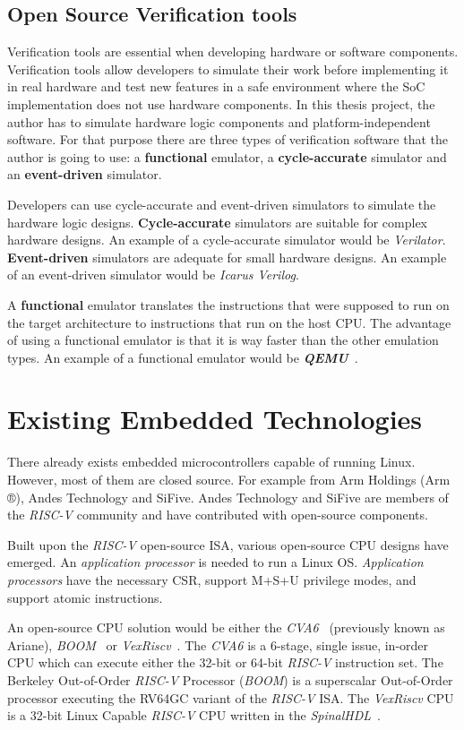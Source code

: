 \subsection{Open Source Verification tools}
Verification tools are essential when developing hardware or software components. Verification tools allow developers to simulate their work before implementing it in real hardware and test new features in a safe environment where the SoC implementation does not use hardware components. In this thesis project, the author has to simulate hardware logic components and platform-independent software. For that purpose there are three types of verification software that the author is going to use: a \textbf{functional} emulator, a \textbf{cycle-accurate} simulator and an \textbf{event-driven} simulator.

Developers can use cycle-accurate and event-driven simulators to simulate the hardware logic designs. \textbf{Cycle-accurate}  simulators are suitable for complex hardware designs. An example of a cycle-accurate simulator would be \textit{Verilator}. \textbf{Event-driven} simulators are adequate for small hardware designs. An example of an event-driven simulator would be \textit{Icarus Verilog}.

A \textbf{functional} emulator translates the instructions that were supposed to run on the target architecture to instructions that run on the host CPU. The advantage of using a functional emulator is that it is way faster than the other emulation types. An example of a functional emulator would be \textbf{\textit{QEMU}}~\cite{bellard2005qemu}.

\section{Existing Embedded Technologies}
\label{sec:existing_embedded_technologies}
There already exists embedded microcontrollers capable of running Linux. However, most of them are closed source. For example from Arm Holdings (Arm ®), Andes Technology and SiFive. Andes Technology and SiFive are members of the \textit{RISC-V} community and have contributed with open-source components. 

Built upon the \textit{RISC-V} open-source ISA, various open-source CPU designs have emerged. An \textit{application processor} is needed to run a Linux OS. \textit{Application processors} have the necessary CSR, support M+S+U privilege modes, and support atomic instructions. 

An open-source CPU solution would be either the \textit{CVA6}~\cite{zaruba2019cost} (previously known as Ariane), \textit{BOOM}~\cite{zhaosonicboom} or \textit{VexRiscv}~\cite{vexriscv}. The \textit{CVA6} is a 6-stage, single issue, in-order CPU which can execute either the 32-bit or 64-bit \textit{RISC-V} instruction set. The Berkeley Out-of-Order \textit{RISC-V} Processor (\textit{BOOM}) is a superscalar Out-of-Order processor executing the RV64GC variant of the \textit{RISC-V} ISA. The \textit{VexRiscv} CPU is a 32-bit Linux Capable \textit{RISC-V} CPU written in the \textit{SpinalHDL}~\cite{papon2017spinalhdl}.